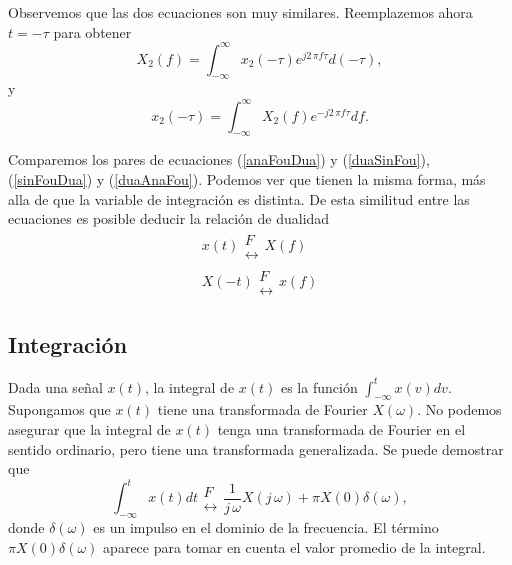 Observemos que las dos ecuaciones son muy similares. Reemplazemos ahora $t = -\tau$ para obtener
\begin{equation}
      X_{2}\left( f\right) = \int_{-\infty }^{\infty }x_{2}\left( -\tau\right) e^{j2 \, \pi f\tau}d(-\tau),
       \label{duaAnaFou}
\end{equation}
y 
\begin{equation}
      x_{2}\left(-\tau\right) =\int_{-\infty }^{\infty }X_{2}\left( f\right) e^{-j2 \, \pi f \tau}df.
       \label{duaSinFou}
\end{equation}

Comparemos los pares de ecuaciones (\ref{anaFouDua}) y (\ref{duaSinFou}), (\ref{sinFouDua}) y 
(\ref{duaAnaFou}). Podemos ver que tienen la misma forma, m\'{a}s alla de que la variable de 
integraci\'{o}n es distinta. De esta similitud entre las ecuaciones es posible deducir la relaci\'{o}n de 
dualidad
\begin{equation}
        \begin{array}{cc}
                x(t)    \begin{array}{l}
                                F \\ 
                                \leftrightarrow
                        \end{array}
                X(f)    \\
                X(-t)   \begin{array}{l}
                                F \\ 
                                \leftrightarrow
                        \end{array}
                x(f)
        \end{array}
\end{equation}

\subsection{Integraci\'{o}n}

Dada una se\~{n}al $x(t)$, la integral de $x(t)$ es la funci\'{o}n $\int_{-\infty}^{t} x(v) dv$.
Supongamos que $x(t)$ tiene una transformada de Fourier $X(\omega)$. No podemos asegurar que la
integral de $x(t)$ tenga una transformada de Fourier en el sentido ordinario, pero tiene una
transformada generalizada. Se puede demostrar que 
\begin{equation}
\int_{-\infty }^{t}x\left( t\right) dt 
\begin{array}{l}
F \\ 
\leftrightarrow
\end{array}
\frac{1}{j \, \omega }X\left( j \, \omega \right) +\pi X\left( 0\right) \delta\left( \omega \right),
\end{equation}
donde $\delta(\omega)$ es un impulso en el dominio de la frecuencia. El t\'{e}rmino 
$\pi X\left( 0\right) \delta\left( \omega \right)$ aparece para tomar en cuenta el valor 
promedio de la integral.


